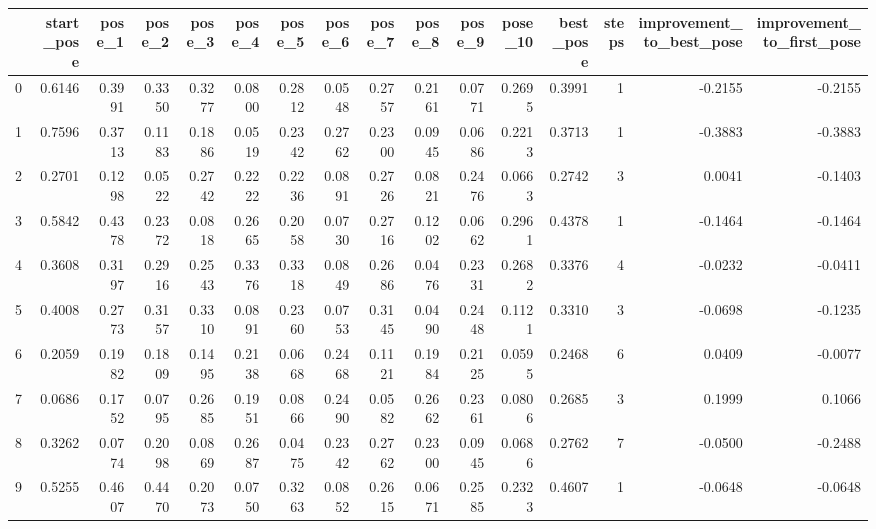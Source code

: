 \begin{tabular}{lrrrrrrrrrrrrrrr}
\toprule
{} &  start\_pose &  pose\_1 &  pose\_2 &  pose\_3 &  pose\_4 &  pose\_5 &  pose\_6 &  pose\_7 &  pose\_8 &  pose\_9 &  pose\_10 &  best\_pose &  steps &  improvement\_to\_best\_pose &  improvement\_to\_first\_pose \\
\midrule
0   &      0.6146 &  0.3991 &  0.3350 &  0.3277 &  0.0800 &  0.2812 &  0.0548 &  0.2757 &  0.2161 &  0.0771 &   0.2695 &     0.3991 &      1 &                   -0.2155 &                    -0.2155 \\
1   &      0.7596 &  0.3713 &  0.1183 &  0.1886 &  0.0519 &  0.2342 &  0.2762 &  0.2300 &  0.0945 &  0.0686 &   0.2213 &     0.3713 &      1 &                   -0.3883 &                    -0.3883 \\
2   &      0.2701 &  0.1298 &  0.0522 &  0.2742 &  0.2222 &  0.2236 &  0.0891 &  0.2726 &  0.0821 &  0.2476 &   0.0663 &     0.2742 &      3 &                    0.0041 &                    -0.1403 \\
3   &      0.5842 &  0.4378 &  0.2372 &  0.0818 &  0.2665 &  0.2058 &  0.0730 &  0.2716 &  0.1202 &  0.0662 &   0.2961 &     0.4378 &      1 &                   -0.1464 &                    -0.1464 \\
4   &      0.3608 &  0.3197 &  0.2916 &  0.2543 &  0.3376 &  0.3318 &  0.0849 &  0.2686 &  0.0476 &  0.2331 &   0.2682 &     0.3376 &      4 &                   -0.0232 &                    -0.0411 \\
5   &      0.4008 &  0.2773 &  0.3157 &  0.3310 &  0.0891 &  0.2360 &  0.0753 &  0.3145 &  0.0490 &  0.2448 &   0.1121 &     0.3310 &      3 &                   -0.0698 &                    -0.1235 \\
6   &      0.2059 &  0.1982 &  0.1809 &  0.1495 &  0.2138 &  0.0668 &  0.2468 &  0.1121 &  0.1984 &  0.2125 &   0.0595 &     0.2468 &      6 &                    0.0409 &                    -0.0077 \\
7   &      0.0686 &  0.1752 &  0.0795 &  0.2685 &  0.1951 &  0.0866 &  0.2490 &  0.0582 &  0.2662 &  0.2361 &   0.0806 &     0.2685 &      3 &                    0.1999 &                     0.1066 \\
8   &      0.3262 &  0.0774 &  0.2098 &  0.0869 &  0.2687 &  0.0475 &  0.2342 &  0.2762 &  0.2300 &  0.0945 &   0.0686 &     0.2762 &      7 &                   -0.0500 &                    -0.2488 \\
9   &      0.5255 &  0.4607 &  0.4470 &  0.2073 &  0.0750 &  0.3263 &  0.0852 &  0.2615 &  0.0671 &  0.2585 &   0.2323 &     0.4607 &      1 &                   -0.0648 &                    -0.0648 \\

\end{tabular}

